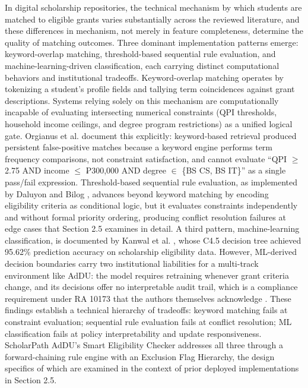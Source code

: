 In digital scholarship repositories, the technical mechanism by which students are matched to eligible grants varies substantially across the reviewed literature, and these differences in mechanism, not merely in feature completeness, determine the quality of matching outcomes. Three dominant implementation patterns emerge: keyword-overlap matching, threshold-based sequential rule evaluation, and machine-learning-driven classification, each carrying distinct computational behaviors and institutional tradeoffs. Keyword-overlap matching operates by tokenizing a student's profile fields and tallying term coincidences against grant descriptions. Systems relying solely on this mechanism are computationally incapable of evaluating intersecting numerical constraints (QPI thresholds, household income ceilings, and degree program restrictions) as a unified logical gate. Orgianus et al. \cite{ref36} document this explicitly: keyword-based retrieval produced persistent false-positive matches because a keyword engine performs term frequency comparisons, not constraint satisfaction, and cannot evaluate ``QPI $\geq$ 2.75 AND income $\leq$ ₱300,000 AND degree $\in$ \{BS CS, BS IT\}'' as a single pass/fail expression. Threshold-based sequential rule evaluation, as implemented by Daluyon and Bilog \cite{ref14}, advances beyond keyword matching by encoding eligibility criteria as conditional logic, but it evaluates constraints independently and without formal priority ordering, producing conflict resolution failures at edge cases that Section 2.5 examines in detail. A third pattern, machine-learning classification, is documented by Kanwal et al. \cite{ref50}, whose C4.5 decision tree achieved 95.62\% prediction accuracy on scholarship eligibility data. However, ML-derived decision boundaries carry two institutional liabilities for a multi-track environment like AdDU: the model requires retraining whenever grant criteria change, and its decisions offer no interpretable audit trail, which is a compliance requirement under RA 10173 that the authors themselves acknowledge \cite{ref50}. These findings establish a technical hierarchy of tradeoffs: keyword matching fails at constraint evaluation; sequential rule evaluation fails at conflict resolution; ML classification fails at policy interpretability and update responsiveness. ScholarPath AdDU's Smart Eligibility Checker addresses all three through a forward-chaining rule engine with an Exclusion Flag Hierarchy, the design specifics of which are examined in the context of prior deployed implementations in Section 2.5.

